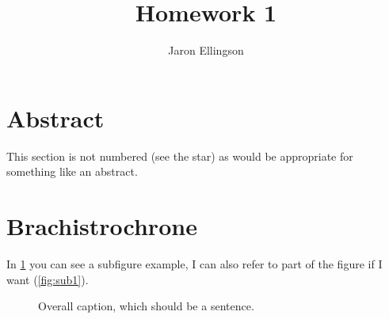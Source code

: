 \documentclass{article}
\begin{document}
\title{Homework 1}
\author{Jaron Ellingson}
\maketitle

\section*{Abstract}

This section is not numbered (see the star) as would be appropriate for something like an abstract.

\section{Brachistrochrone}

In \cref{fig:sub} you can see a subfigure example, I can also refer to part of the figure if I want (\cref{fig:sub1}).

\begin{figure}[htbp]
	\centering
	\qquad
	\caption{Overall caption, which should be a sentence.}
	\label{fig:sub}
\end{figure}
\end{document}
